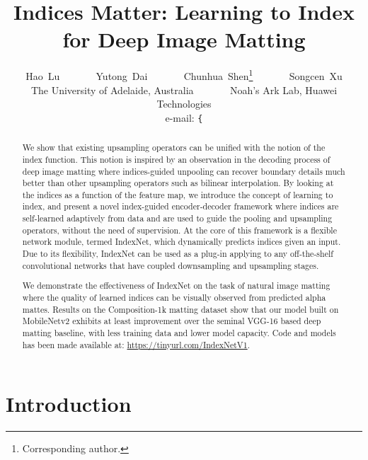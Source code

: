 \documentclass[10pt,twocolumn,letterpaper]{article}
\begin{document}
\title{
Indices Matter: Learning to Index for Deep Image Matting
}

\author{Hao~Lu ~ ~ ~ ~ Yutong~Dai
~ ~ ~ ~
Chunhua~Shen\thanks{Corresponding author.} ~ ~ ~ ~ Songcen~Xu\\
The University of Adelaide, Australia ~ ~ ~ ~
Noah's Ark Lab, Huawei Technologies\\
e-mail: {\tt\small \{}
}

\maketitle
\thispagestyle{empty}

\begin{abstract}

We show that existing upsampling operators can be unified with the notion of the index function. This notion is inspired by an observation in the decoding process of deep image matting where indices-guided unpooling can recover boundary details much better than other upsampling operators such as bilinear interpolation. By looking at the indices as a function of the feature map, we introduce the concept of learning to index, and present a novel index-guided encoder-decoder framework where indices are self-learned adaptively from data and are used to guide the pooling and upsampling operators, without the need of supervision. At the core of this framework is a flexible network module, termed IndexNet, which dynamically predicts indices given an input. Due to its flexibility, IndexNet can be used as a plug-in applying to any off-the-shelf convolutional networks that have coupled downsampling and upsampling stages.

	We demonstrate the effectiveness of IndexNet on the task of natural image matting where the quality of learned indices can be visually observed from predicted alpha mattes. Results on the Composition-1k matting dataset show that our model built on MobileNetv2 exhibits at least  improvement over the seminal VGG-16 based deep matting baseline, with less training data and lower model capacity. Code and models has been made available at: {\small\url{https://tinyurl.com/IndexNetV1}}.


\end{abstract}



\section{Introduction}
\end{document}
